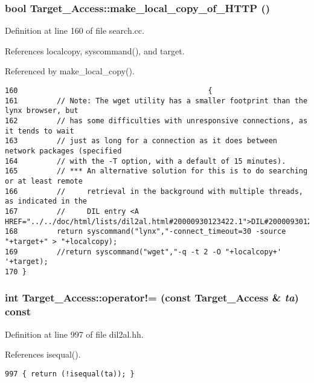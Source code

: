 \subsubsection{\setlength{\rightskip}{0pt plus 5cm}bool Target\_\-Access::make\_\-local\_\-copy\_\-of\_\-HTTP ()\hspace{0.3cm}{\tt  [protected]}}\label{classTarget__Access_b6}




Definition at line 160 of file search.cc.

References localcopy, syscommand(), and target.

Referenced by make\_\-local\_\-copy().



\footnotesize\begin{verbatim}160                                            {
161         // Note: The wget utility has a smaller footprint than the lynx browser, but
162         // has some difficulties with unresponsive connections, as it tends to wait
163         // just as long for a connection as it does between network packages (specified
164         // with the -T option, with a default of 15 minutes).
165         // *** An alternative solution for this is to do searching or at least remote
166         //     retrieval in the background with multiple threads, as indicated in the
167         //     DIL entry <A HREF="../../doc/html/lists/dil2al.html#20000930123422.1">DIL#20000930123422.1</A>.
168         return syscommand("lynx","-connect_timeout=30 -source "+target+" > "+localcopy);
169         //return syscommand("wget","-q -t 2 -O "+localcopy+' '+target);
170 }
\end{verbatim}\normalsize 
{}
\subsubsection{\setlength{\rightskip}{0pt plus 5cm}int Target\_\-Access::operator!= (const Target\_\-Access \& {\em ta}) const\hspace{0.3cm}{\tt  [inline]}}\label{classTarget__Access_a5}




Definition at line 997 of file dil2al.hh.

References isequal().



\footnotesize\begin{verbatim}997 { return (!isequal(ta)); }
\end{verbatim}\normalsize 
{}
